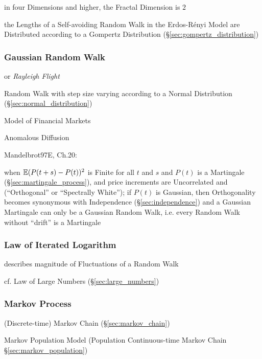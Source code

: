 in four Dimensions and higher, the Fractal Dimension is $2$

the Lengths of a Self-avoiding Random Walk in the Erdos-R\'enyi Model are
Distributed according to a Gompertz Distribution
(\S\ref{sec:gompertz_distribution})



\subsubsection{Gaussian Random Walk}\label{sec:gaussian_random_walk}

or \emph{Rayleigh Flight}

Random Walk with step size varying according to a Normal Distribution
(\S\ref{sec:normal_distribution})

Model of Financial Markets

Anomalous Diffusion

Mandelbrot97E, Ch.20:

when $\mathbb{E}(P(t + s) - P(t))^2$ is Finite for all $t$ and $s$ and $P(t)$ is a
Martingale (\S\ref{sec:martingale_process}), and price increments are
Uncorrelated and (``Orthogonal'' or ``Spectrally White''); if $P(t)$ is
Gaussian, then Orthogonality becomes synonymous with Independence
(\S\ref{sec:independence}) and a Gaussian Martingale can only be a Gaussian
Random Walk, i.e. every Random Walk without ``drift'' is a Martingale



\subsubsection{Law of Iterated Logarithm}\label{sec:iterated_logarithm}

describes magnitude of Fluctuations of a Random Walk

cf. Law of Large Numbers (\S\ref{sec:large_numbers})



\subsubsection{Markov Process}\label{sec:markov_process}


\fist (Discrete-time) Markov Chain (\S\ref{sec:markov_chain})

\fist Markov Population Model (Population Continuous-time Markov Chain
\S\ref{sec:markov_population})

